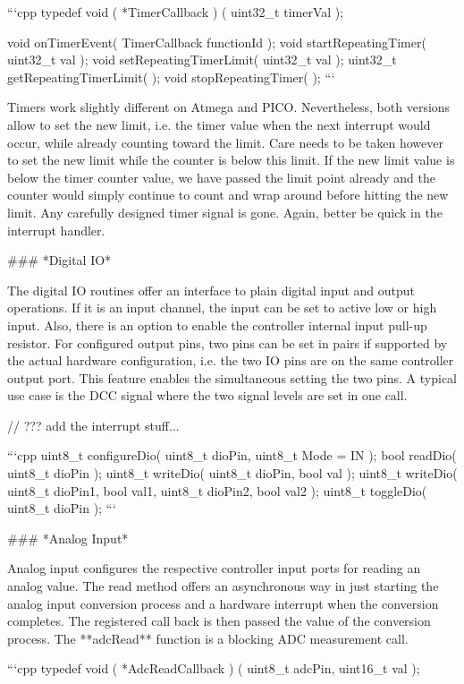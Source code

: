 ```cpp
   typedef void ( *TimerCallback ) ( uint32_t timerVal );

   void          onTimerEvent( TimerCallback functionId );
   void          startRepeatingTimer( uint32_t val );
   void          setRepeatingTimerLimit( uint32_t val );
   uint32_t      getRepeatingTimerLimit( );
   void          stopRepeatingTimer( );
```

Timers work slightly different on Atmega and PICO. Nevertheless, both versions allow to set the new limit, i.e. the timer value when the next interrupt would occur, while already counting toward the limit. Care needs to be taken however to set the new limit while the counter is below this limit. If the new limit value is below the timer counter value, we have passed the limit point already and the counter would simply continue to count and wrap around before hitting the new limit. Any carefully designed timer signal is gone. Again, better be quick in the interrupt handler.

### *Digital IO*

The digital IO routines offer an interface to plain digital input and output operations. If it is an input channel, the input can be set to active low or high input. Also, there is an option to enable the controller internal input pull-up resistor. For configured output pins, two pins can be set in pairs if supported by the actual hardware configuration, i.e. the two IO pins are on the same controller output port. This feature enables the simultaneous setting the two pins. A typical use case is the DCC signal where the two signal levels are set in one call.

// ??? add the interrupt stuff...

```cpp
   uint8_t       configureDio( uint8_t dioPin, uint8_t Mode = IN );
   bool          readDio( uint8_t dioPin );
   uint8_t       writeDio( uint8_t dioPin, bool val );
   uint8_t       writeDio( uint8_t dioPin1, bool val1, uint8_t dioPin2, bool val2 );
   uint8_t       toggleDio( uint8_t dioPin );
```

### *Analog Input*

Analog input configures the respective controller input ports for reading an analog value. The read method offers an asynchronous way in just starting the analog input conversion process and a hardware interrupt when the conversion completes. The registered call back is then passed the value of the conversion process. The **adcRead** function is a blocking ADC measurement call.

```cpp
   typedef void ( *AdcReadCallback ) ( uint8_t adcPin, uint16_t val );

